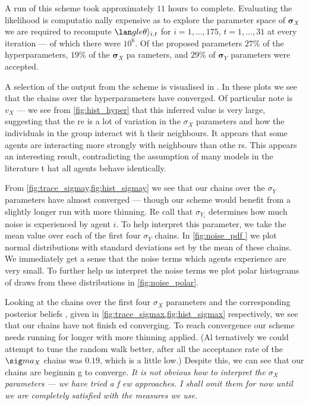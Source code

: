 A run of this scheme took approximately $11$ hours to complete. Evaluating the likelihood is computatio
nally expensive as to explore the parameter space of $\bm{\sigma}_X$ we are required to recompute $\lan
gle \theta \rangle_{i, t}$ for $i=1,\ldots,175$, $t=1,\ldots,31$ at every iteration --- of which there 
were $10^6$. Of the proposed parameters $27\%$ of the hyperparameters, $19\%$ of the $\bm{\sigma}_X$ pa
rameters, and $29\%$ of $\bm{\sigma}_Y$ parameters were accepted.

A selection of the output from the scheme is visualised in 
. In these plots we see that the chains over the hyperparameters have converged. Of particular note is 
$v_X$ --- we see from \cref{fig:hist_hyper} that this inferred value is very large, suggesting that the
re is a lot of variation in the $\sigma_X$ parameters and how the individuals in the group interact wit
h their neighbours. It appears that some agents are interacting more strongly with neighbours than othe
rs. This appears an interesting result, contradicting the assumption of many models in the literature t
hat all agents behave identically.

From \cref{fig:trace_sigmay,fig:hist_sigmay} we see that our chains over the $\sigma_Y$ parameters have
 almost converged --- though our scheme would benefit from a slightly longer run with more thinning. Re
call that $\sigma_{Y_i}$ determines how much noise is experienced by agent $i$. To help interpret this 
parameter, we take the mean value over each of the first four $\sigma_Y$ chains. In \cref{fig:noise_pdf
} we plot normal distributions with standard deviations set by the mean of these chains. We immediately
 get a sense that the noise terms which agents experience are very small. To further help us interpret 
the noise terms we plot polar histograms of draws from these distributions in \cref{fig:noise_polar}.

Looking at the chains over the first four $\sigma_X$ parameters and the corresponding posterior beliefs
, given in \cref{fig:trace_sigmax,fig:hist_sigmax} respectively, we see that our chains have not finish
ed converging. To reach convergence our scheme needs running for longer with more thinning applied. (Al
ternatively we could attempt to tune the random walk better, after all the acceptance rate of the $\sig
ma_X$ chains was $0.19$, which is a little low.)  Despite this, we can see that our chains are beginnin
g to converge. \emph{It is not obvious how to interpret the $\sigma_X$ parameters --- we have tried a f
ew approaches. I shall omit them for now until we are completely satisfied with the measures we use.}

